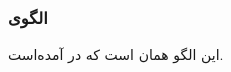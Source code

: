 \subsubsection{الگوی }
\label{ArmoushMixProtSingleChSec}
\begin{RTL}
این الگو همان  است
که در \cite{ref4} آمده‌است.
\end{RTL}